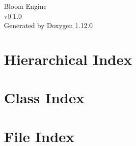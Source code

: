 \documentclass[twoside]{book}
\newcommand{\+}{\discretionary{\mbox{\scriptsize$\hookleftarrow$}}{}{}}
\newcommand{\clearemptydoublepage}{%
    \newpage{\pagestyle{empty}\cleardoublepage}%
  }
\begin{document}
  \raggedbottom
    \hypersetup{pageanchor=false,
                bookmarksnumbered=true,
                pdfencoding=unicode
               }
  \begin{titlepage}
  \vspace*{7cm}
  \begin{center}%
  {\Large Bloom Engine}\\
  [1ex]\large v0.\+1.\+0 \\
  \vspace*{1cm}
  {\large Generated by Doxygen 1.12.0}\\
  \end{center}
  \end{titlepage}
  \clearemptydoublepage
  \tableofcontents
  \clearemptydoublepage
  \hypersetup{pageanchor=true}

\chapter{Hierarchical Index}

\chapter{Class Index}

\chapter{File Index}

\end{document}
